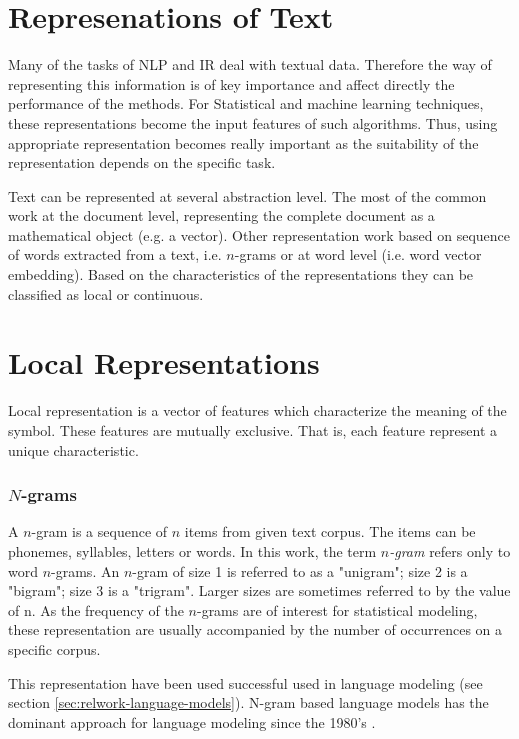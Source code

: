 \section{Represenations of Text}
 \label{sec:rel_represenation_text}
  Many of the tasks of \ac{NLP} and \ac{IR} deal with textual data. Therefore
  the way  of representing this information is of key importance and affect
  directly the performance of the methods.  For  Statistical and machine
  learning techniques, these representations become the input features of
  such algorithms. Thus, using appropriate representation  becomes really
  important as the suitability of the representation  depends on the specific
  task.
  
  Text can be represented at several abstraction level.  The most of the
  common work at the document level, representing the complete document as a
  mathematical object (e.g. a vector). Other representation work based on
  sequence of words extracted from a text, i.e. $n$-grams or at word level
  (i.e. word vector embedding). Based on the characteristics of the
  representations they can be classified as local or continuous. 
 
  

\section{Local Representations}
 \label{sec:rel_local_representation}
 Local representation is a vector of features which characterize the
 meaning of the symbol. These  features  are mutually exclusive. That is, each feature
 represent a unique characteristic.
 
 \subsubsection{$N$-grams}
 \label{sec:sub_ngrams}

A $n$-gram is a sequence of $n$ items from given text corpus. The items can
be phonemes, syllables, letters or words. In this  work, the term
\textit{$n$-gram} refers only   to  word $n$-grams.
An $n$-gram of size 1 is referred to as a "unigram"; size 2 is a "bigram";
size 3 is a "trigram". Larger sizes are sometimes referred to by the value of
n. As the frequency of the $n$-grams are of interest for statistical
modeling, these representation are usually accompanied by the number of
occurrences on a specific corpus. 


This representation  have been used successful used in language modeling (see section
\ref{sec:relwork-language-models}). N-gram based language models has the dominant approach for
 language modeling since the 1980's \cite{Bengio:2008}.


